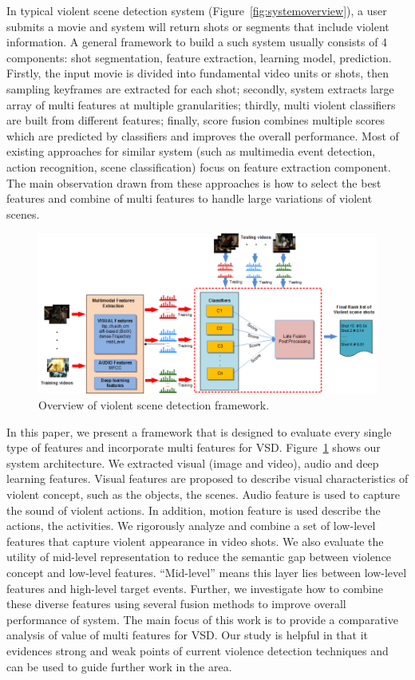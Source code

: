 \documentclass[review]{elsarticle}
\begin{document}
In typical violent scene detection system (Figure~\ref{fig:systemoverview}), a user submits a movie and system will return shots or segments that include violent information. A general framework to build a such system usually consists of 4 components: shot segmentation, feature extraction, learning model, prediction. Firstly, the input movie is divided into fundamental video units or shots, then sampling keyframes are extracted for each shot; secondly, system extracts large array of multi features at multiple granularities; thirdly, multi violent classifiers are built from different features; finally, score fusion combines multiple scores which are predicted by classifiers and improves the overall performance. Most of existing approaches for similar system (such as multimedia event detection, action recognition, scene classification) focus on feature extraction component. The main observation drawn from these approaches is how to select the best features and combine of multi features to handle large variations of violent scenes. 
\begin{figure}[!t]
	\centering
	\includegraphics[width=1\linewidth]{Images/Framework1.png}
	\caption{Overview of violent scene detection framework.}
	\label{fig:framework}
\end{figure}

In this paper, we present a framework that is designed to evaluate every single type of features and incorporate multi features for VSD. Figure~\ref{fig:framework} shows our system architecture.  We extracted visual (image and video), audio and deep learning features. Visual features are proposed to describe visual characteristics of violent concept, such as the objects, the scenes. Audio feature is used to capture the sound of violent actions. In addition, motion feature is used describe the actions, the activities. We rigorously analyze and combine a set of low-level features that capture violent appearance in video shots. We also evaluate the utility of mid-level representation to reduce the semantic gap between violence concept and low-level features. “Mid-level” means this layer lies between low-level features and high-level target events. Further, we investigate how to combine these diverse features using several fusion methods to improve overall performance of system. The main focus of this work is to provide a comparative analysis of value of multi features for VSD. Our study is helpful in that it evidences strong and weak points of current violence detection techniques and can be used to guide further work in the area.
\end{document}
